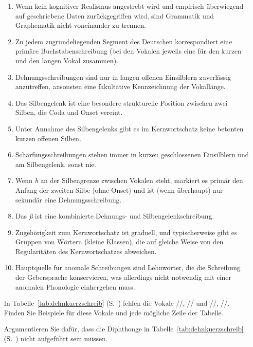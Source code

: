 \begin{enumerate}
  \item Wenn kein kognitiver Realismus angestrebt wird und empirisch überwiegend auf geschriebene Daten zurückgegriffen wird, sind Grammatik und Graphematik nicht voneinander zu trennen.
  \item Zu jedem zugrundeliegenden Segment des Deutschen korrespondiert eine primäre Buchstabenschreibung (bei den Vokalen jeweils eine für den kurzen und den langen Vokal zusammen).
  \item Dehnungsschreibungen sind nur in langen offenen Einsilblern zuverlässig anzutreffen, ansonsten eine fakultative Kennzeichnung der Vokallänge.
  \item Das Silbengelenk ist eine besondere strukturelle Position zwischen zwei Silben, die Coda und Onset vereint.
  \item Unter Annahme des Silbengelenks gibt es im Kernwortschatz keine betonten kurzen offenen Silben.
  \item Schärfungsschreibungen stehen immer in kurzen geschlossenen Einsilblern und am Silbengelenk, sonst nie.
  \item Wenn \textit{h} an der Silbengrenze zwischen Vokalen steht, markiert es primär den Anfang der zweiten Silbe (ohne Onset) und ist (wenn überhaupt) nur sekundär eine Dehnungsschreibung.
  \item Das \textit{ß} ist eine kombinierte Dehnungs- und Silbengelenkschreibung.
  \item Zugehörigkeit zum Kernwortschatz ist graduell, und typischerweise gibt es Gruppen von Wörtern (kleine Klassen), die auf gleiche Weise von den Regularitäten des Kernwortschatzes abweichen.
  \item Hauptquelle für anomale Schreibungen sind Lehnwörter, die die Schreibung der Gebersprache konservieren, was allerdings nicht notwendig mit einer anomalen Phonologie einhergehen muss.
\end{enumerate}

\Uebungen

\Uebung \label{u141} In Tabelle~\ref{tab:dehnkuerzschreib} (S.~\pageref{tab:dehnkuerzschreib}) fehlen die Vokale //, // und /\textipa{\o}/, /\textipa{\oe}/.
Finden Sie Beispiele für diese Vokale und jede mögliche Zeile der Tabelle.

\Uebung[\tristar] \label{u142} Argumentieren Sie dafür, dass die Diphthonge in Tabelle~\ref{tab:dehnkuerzschreib} (S.~\pageref{tab:dehnkuerzschreib}) nicht aufgeführt sein müssen.

